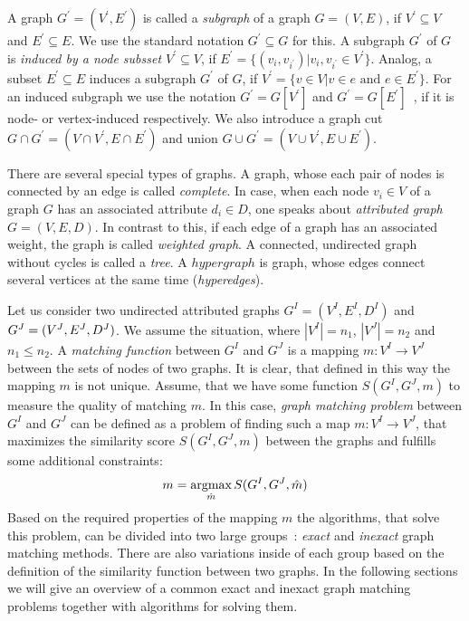 A graph $G^\prime=(V^\prime,E^\prime)$ is called a \emph{subgraph} of a graph $G=(V,E)$, if $V^\prime\subseteq V$ and $E^\prime\subseteq E$. We use the standard notation $G^\prime\subseteq G$ for this. A subgraph $G^\prime$ of $G$ is \emph{induced by a node subsset $V^\prime\subseteq V$}, if $E^\prime=\{(v_i, v_{i^\prime})|v_i,v_{i^\prime}\in V^\prime\}$. Analog, a subset $E^\prime\subseteq E$ induces a subgraph $G^\prime$ of $G$, if $V^\prime=\{v\in V|v\in e\text{ and }e\in E^\prime\}$. For an induced subgraph we use the notation $G^\prime=G[V^\prime]$ and $G^\prime=G[E^\prime]$~\cite{Diestel2000}, if it is node- or vertex-induced respectively. We also introduce a graph cut $G\cap G^\prime=(V\cap V^\prime, E\cap E^\prime)$ and union $G\cup G^\prime=(V\cup V^\prime, E\cup E^\prime)$.

There are several special types of graphs. A graph, whose each pair of nodes is connected by an edge is called \emph{complete}. In case, when each node $v_i\in V$ of a graph $G$ has an associated attribute $d_i\in D$, one speaks about \emph{attributed graph} $G=(V,E,D)$. In contrast to this, if each edge of a graph has an associated weight, the graph is called \emph{weighted graph}. A connected, undirected graph without cycles is called a \emph{tree}. A $hypergraph$ is graph, whose edges connect several vertices at the same time (\emph{hyperedges}).

Let us consider two undirected attributed graphs $G^I = (V^I, E^I, D^I)$ and $G^J = (V^J, E^J,\newline D^J)$. We assume the situation, where $|V^I|=n_1$, $|V^J|=n_2$ and $n_1\le n_2$. A \emph{matching function} between $G^I$ and $G^J$ is a mapping $m:V^I\rightarrow V^J$ between the sets of nodes of two graphs.
It is clear, that defined in this way the mapping $m$ is not unique. Assume, that we have some function $S(G^I, G^J, m)$ to measure the quality of matching $m$. In this case, \emph{graph matching problem} between $G^I$ and $G^J$ can be defined as a problem of finding such a map $m:V^I\rightarrow V^J$, that maximizes the similarity score $S(G^I, G^J, m)$ between the graphs and fulfills some additional constraints:
\begin{equation} \label{gGMP}
m = \mathop{\rm argmax}_{\hat{m}}S(G^I, G^J, \hat{m})
\end{equation}
Based on the required properties of the mapping $m$ the algorithms, that solve this problem, can be divided into two large groups~\cite{Conte2004}: \emph{exact} and \emph{inexact} graph matching methods. There are also variations inside of each group based on the definition of the similarity function between two graphs. In the following sections we will give an overview of a common exact and inexact graph matching problems together with algorithms for solving them.
